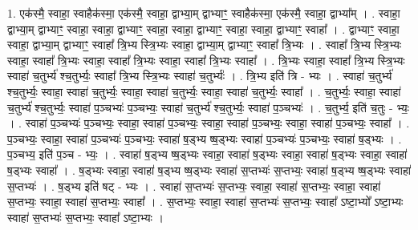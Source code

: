 \documentclass[17pt]{extarticle}
\begin{document}
1. एक॑स्मै॒ स्वाहा॒ स्वाहैक॑स्मा॒ एक॑स्मै॒ स्वाहा॒ द्वाभ्या॒म् द्वाभ्याꣳ॒॒ स्वाहैक॑स्मा॒ एक॑स्मै॒ स्वाहा॒ द्वाभ्या᳚म् । . स्वाहा॒ द्वाभ्या॒म् द्वाभ्याꣳ॒॒ स्वाहा॒ स्वाहा॒ द्वाभ्याꣳ॒॒ स्वाहा॒ स्वाहा॒ द्वाभ्याꣳ॒॒ स्वाहा॒ स्वाहा॒ द्वाभ्याꣳ॒॒ स्वाहा᳚ । . द्वाभ्याꣳ॒॒ स्वाहा॒ स्वाहा॒ द्वाभ्या॒म् द्वाभ्याꣳ॒॒ स्वाहा᳚ त्रि॒भ्य स्त्रि॒भ्यः स्वाहा॒ द्वाभ्या॒म् द्वाभ्याꣳ॒॒ स्वाहा᳚ त्रि॒भ्यः । . स्वाहा᳚ त्रि॒भ्य स्त्रि॒भ्यः स्वाहा॒ स्वाहा᳚ त्रि॒भ्यः स्वाहा॒ स्वाहा᳚ त्रि॒भ्यः स्वाहा॒ स्वाहा᳚ त्रि॒भ्यः स्वाहा᳚ । . त्रि॒भ्यः स्वाहा॒ स्वाहा᳚ त्रि॒भ्य स्त्रि॒भ्यः स्वाहा॑ च॒तुर्भ्य॑ श्च॒तुर्भ्यः॒ स्वाहा᳚ त्रि॒भ्य स्त्रि॒भ्यः स्वाहा॑ च॒तुर्भ्यः॑ । . त्रि॒भ्य इति॑ त्रि - भ्यः । . स्वाहा॑ च॒तुर्भ्य॑ श्च॒तुर्भ्यः॒ स्वाहा॒ स्वाहा॑ च॒तुर्भ्यः॒ स्वाहा॒ स्वाहा॑ च॒तुर्भ्यः॒ स्वाहा॒ स्वाहा॑ च॒तुर्भ्यः॒ स्वाहा᳚ । . च॒तुर्भ्यः॒ स्वाहा॒ स्वाहा॑ च॒तुर्भ्य॑ श्च॒तुर्भ्यः॒ स्वाहा॑ प॒ञ्चभ्यः॑ प॒ञ्चभ्यः॒ स्वाहा॑ च॒तुर्भ्य॑ श्च॒तुर्भ्यः॒ स्वाहा॑ प॒ञ्चभ्यः॑ । . च॒तुर्भ्य॒ इति॑ च॒तुः - भ्यः॒ । . स्वाहा॑ प॒ञ्चभ्यः॑ प॒ञ्चभ्यः॒ स्वाहा॒ स्वाहा॑ प॒ञ्चभ्यः॒ स्वाहा॒ स्वाहा॑ प॒ञ्चभ्यः॒ स्वाहा॒ स्वाहा॑ प॒ञ्चभ्यः॒ स्वाहा᳚ । . प॒ञ्चभ्यः॒ स्वाहा॒ स्वाहा॑ प॒ञ्चभ्यः॑ प॒ञ्चभ्यः॒ स्वाहा॑ ष॒ड्भ्य ष्ष॒ड्भ्यः स्वाहा॑ प॒ञ्चभ्यः॑ प॒ञ्चभ्यः॒ स्वाहा॑ ष॒ड्भ्यः । . प॒ञ्चभ्य॒ इति॑ प॒ञ्च - भ्यः॒ । . स्वाहा॑ ष॒ड्भ्य ष्ष॒ड्भ्यः स्वाहा॒ स्वाहा॑ ष॒ड्भ्यः स्वाहा॒ स्वाहा॑ ष॒ड्भ्यः स्वाहा॒ स्वाहा॑ ष॒ड्भ्यः स्वाहा᳚ । . ष॒ड्भ्यः स्वाहा॒ स्वाहा॑ ष॒ड्भ्य ष्ष॒ड्भ्यः स्वाहा॑ स॒प्तभ्यः॑ स॒प्तभ्यः॒ स्वाहा॑ ष॒ड्भ्य ष्ष॒ड्भ्यः स्वाहा॑ स॒प्तभ्यः॑ । . ष॒ड्भ्य इति॑ षट् - भ्यः । . स्वाहा॑ स॒प्तभ्यः॑ स॒प्तभ्यः॒ स्वाहा॒ स्वाहा॑ स॒प्तभ्यः॒ स्वाहा॒ स्वाहा॑ स॒प्तभ्यः॒ स्वाहा॒ स्वाहा॑ स॒प्तभ्यः॒ स्वाहा᳚ । . स॒प्तभ्यः॒ स्वाहा॒ स्वाहा॑ स॒प्तभ्यः॑ स॒प्तभ्यः॒ स्वाहा᳚ ऽष्टा॒भ्यो᳚ ऽष्टा॒भ्यः स्वाहा॑ स॒प्तभ्यः॑ स॒प्तभ्यः॒ स्वाहा᳚ ऽष्टा॒भ्यः । \newline
\end{document}
